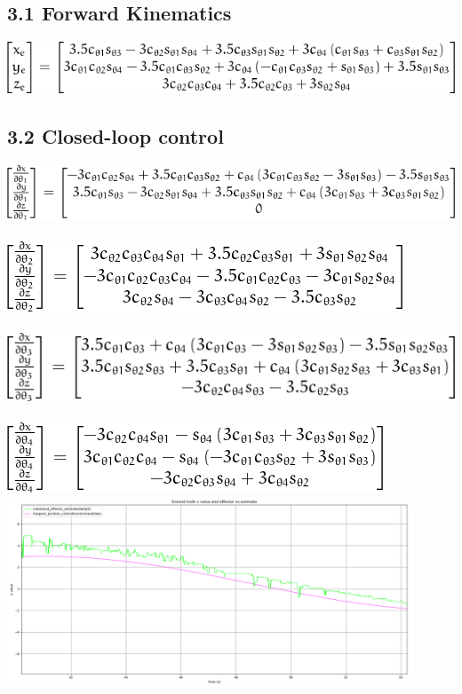 

\subsection{3.1 Forward Kinematics}

\includegraphics[]{x_y_z.png} \\

\subsection{3.2 Closed-loop control}
\includegraphics[]{jac_col1.png} \\ \\
\includegraphics[]{jac_col2.png} \\ \\
\includegraphics[]{jac_col3.png} \\ \\
\includegraphics[]{jac_col4.png} \\
\includegraphics[width=0.9\textwidth]{plots/closed_x.png} \\
